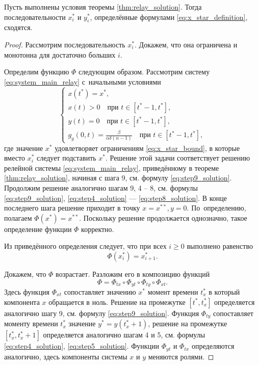 \begin{lemma}
	\label{lm:convergence_x_star}
	Пусть выполнены условия теоремы \ref{thm:relay_solution}. Тогда последовательности $x^*_i$ и $y^*_i$, определённые формулами \eqref{eq:x_star_definition}, сходятся.
\end{lemma}
\begin{proof}
	
	Рассмотрим последовательность $x^*_i$. Докажем, что она ограничена и монотонна для достаточно больших $i$.
	
	Определим функцию $\Phi$ следующим образом. Рассмотрим систему \eqref{eq:system_main_relay} с~начальными условиями
	\begin{equation}
		\label{eq:lm_star_sonvergence_initial_problem}
	\begin{cases}
		x(t^*) = x^*,\\
		x(t) > 0 \quad \text{при } t \in [t^* - 1, t^*],\\
		y(t) = 0 \quad \text{при } t \in [t^* - 1, t^*],\\
		g_y(0, t) = \frac{\beta}{\alpha\delta(n - 1)} \quad \text{при } t \in [t^* - 1, t^*],
	\end{cases}
	\end{equation}
	где значение $x^*$ удовлетворяет ограничениям \eqref{eq:x_star_bound}, в которые вместо $x_i^*$ следует подставить $x^*$. Решение этой задачи соответствует решению релейной системы \eqref{eq:system_main_relay}, приведённому в теореме \ref{thm:relay_solution}, начиная с шага 9, см. формулу \eqref{eq:step9_solution}. Продолжим решение аналогично шагам 9, 4 -- 8, см. формулы \eqref{eq:step9_solution}, \eqref{eq:step4_solution} --- \eqref{eq:step8_solution}. В конце последнего шага решение приходит в точку $x = x^{**}, y = 0$. По~определению, полагаем $\Phi(x^*) = x^{**}$. Поскольку решение продолжается однозначно, такое определение функции $\Phi$ корректно.
	
	Из приведённого определения следует, что при всех $i \geq 0$ выполнено равенство
	\begin{equation}
		\label{eq:flow_relay}
		\Phi(x^*_i) = x^*_{i + 1}.
	\end{equation}
	
	Докажем, что $\Phi$ возрастает. Разложим его в композицию функций
	\[
	\Phi = \Phi_{tx} \circ \Phi_{yt} \circ \Phi_{ty} \circ \Phi_{xt}.
	\]
	Здесь функция $\Phi_{xt}$ сопоставляет значению $x^*$ момент времени $t^*_x$ в который компонента $x$ обращается в ноль. Решение на промежутке $[t^*, t_x^*]$ определяется аналогично шагу 9, см. формулу \eqref{eq:step9_solution}. Функция $\Phi_{ty}$ сопоставляет моменту времени $t^*_x$ значение $y^* = y(t^*_x + 1)$, решение на промежутке $[t_x^*, t_x^* + 1]$ определяется аналогично шагам 4 и 5, см. формулы \eqref{eq:step4_solution}, \eqref{eq:step5_solution}. Функции $\Phi_{yt}$ и $\Phi_{tx}$ определяются аналогично, здесь компоненты системы $x$ и $y$ меняются ролями.
	

\end{proof}

